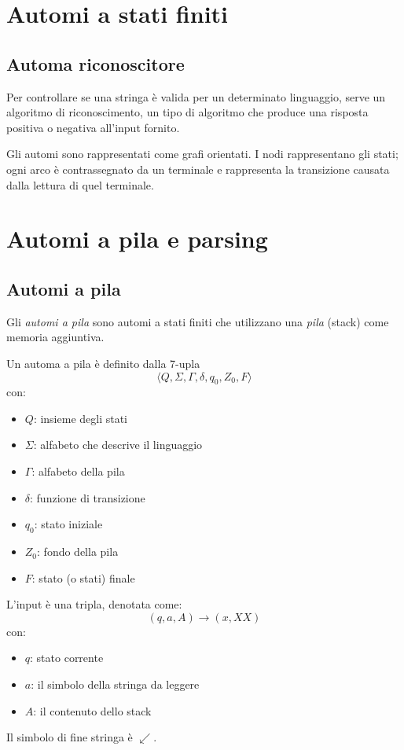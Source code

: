 \documentclass[11pt]{article}
\begin{document}
\section{Automi a stati finiti}
\subsection{Automa riconoscitore}
Per controllare se una stringa è valida per un determinato linguaggio, serve un algoritmo di riconoscimento, un tipo di 
algoritmo che produce una risposta positiva o negativa all'input fornito. 

Gli automi sono rappresentati come grafi orientati. I nodi rappresentano gli stati; ogni arco è contrassegnato da un 
terminale e rappresenta la transizione causata dalla lettura di quel terminale.






















\section{Automi a pila e parsing}
\subsection{Automi a pila}
Gli \textit{automi a pila} sono automi a stati finiti che utilizzano una \textit{pila} (stack) come memoria aggiuntiva.

Un automa a pila è definito dalla 7-upla 
\begin{equation*}
    \langle Q,\Sigma,\Gamma,\delta,q_0,Z_0,F \rangle
\end{equation*}
con:
\begin{itemize}
    \item $Q$: insieme degli stati
    \item $\Sigma$: alfabeto che descrive il linguaggio
    \item $\Gamma$: alfabeto della pila 
    \item $\delta$: funzione di transizione
    \item $q_0$: stato iniziale 
    \item $Z_0$: fondo della pila 
    \item $F$: stato (o stati) finale
\end{itemize}
L'input è una tripla, denotata come:
\begin{equation*}
    (q,a,A)\rightarrow(x,XX)
\end{equation*}
con:
\begin{itemize}
    \item $q$: stato corrente
    \item $a$: il simbolo della stringa da leggere
    \item $A$: il contenuto dello stack
\end{itemize}
Il simbolo di fine stringa è $\swarrow$.
\end{document}
